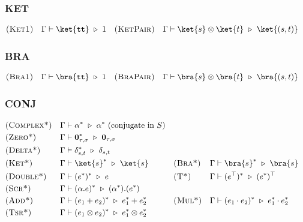 

\subsubsection*{\textsf{KET}}
\begin{align*}
  & \textsc{(Ket1)} && \Gamma \vdash \ket{\utt} \reduce 1
  && \textsc{(KetPair)} && \Gamma \vdash \ket{s} \otimes \ket{t}\reduce\ket{(s, t)} 
\end{align*}

\subsubsection*{\textsf{BRA}}
\begin{align*}
  & \textsc{(Bra1)} && \Gamma \vdash \bra{\utt} \reduce 1
  && \textsc{(BraPair)} && \Gamma \vdash \bra{s} \otimes \bra{t}\reduce\bra{(s, t)} 
\end{align*}


\subsubsection*{\textsf{CONJ}}
\begin{align*}
  & \textsc{(Complex*)} && \Gamma \vdash \alpha^* \reduce \alpha^*\ \textrm{(conjugate in $S$)} \\
  & \textsc{(Zero*)} && \Gamma \vdash \textbf{0}_{\tau, \sigma}^* \reduce \textbf{0}_{\tau, \sigma} \\
  & \textsc{(Delta*)} &&
  \Gamma \vdash \delta_{s,t}^* \reduce \delta_{s,t}\\
  & \textsc{(Ket*)} && \Gamma \vdash \ket{s}^* \reduce \ket{s}
  && \textsc{(Bra*)} && \Gamma \vdash \bra{s}^* \reduce \bra{s} \\
  & \textsc{(Double*)} && \Gamma \vdash (e^*)^*\reduce e
  && \textsc{(T*)} && \Gamma \vdash (e^\top)^* \reduce(e^*)^\top \\
  & \textsc{(Scr*)} && \Gamma \vdash (\alpha.e)^* \reduce (\alpha^*).(e^*) \\
  & \textsc{(Add*)} && \Gamma \vdash (e_1 + e_2)^* \reduce e_1^* + e_2^* 
  && \textsc{(Mul*)} && \Gamma \vdash (e_1 \cdot e_2)^* \reduce e_1^* \cdot e_2^* \\
  & \textsc{(Tsr*)} && \Gamma \vdash (e_1 \otimes e_2)^* \reduce e_1^* \otimes e_2^*
\end{align*}


